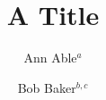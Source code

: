 \documentclass[aps,prd]{revtex4-1}

\title{A Title}
\author{Ann Able$^{a}$}
\author{Bob Baker$^{b,c}$}
\begin{abstract}Abs.\end{abstract}
\maketitle
Body.

